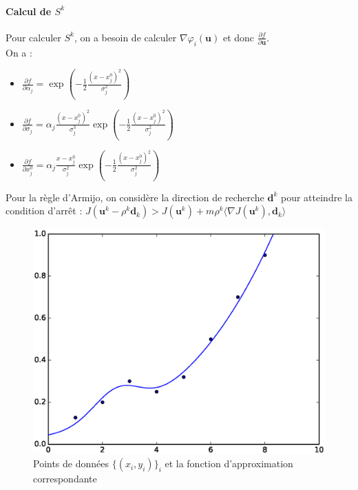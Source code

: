 \documentclass[paper=a4, fontsize=11pt]{article}
\begin{document}
\paragraph{Calcul de $S^k$\\}
Pour calculer $S^k$, on a besoin de calculer $\nabla\varphi_i(\textbf{u})$ et donc $\frac{\partial f }{\partial\textbf{u}}$.\\
On a : \\
\begin{itemize}[label=\textbullet]
\item $\frac{\partial f }{\partial\alpha_j} = \exp(-\frac{1}{2}\frac{(x-x_j^0)^2}{\sigma_j^2})$ 
\item $\frac{\partial f }{\partial\sigma_j} = \alpha_j\frac{(x-x_j^0)^2}{\sigma_j^3}\exp(-\frac{1}{2}\frac{(x-x_j^0)^2}{\sigma_j^2}) $
\item $\frac{\partial f }{\partial x_j^0} = \alpha_j\frac{x-x_j^0}{\sigma_j^2}\exp(-\frac{1}{2}\frac{(x-x_j^0)^2}{\sigma_j^2})$
\end{itemize}
Pour la règle d'Armijo, on considère la direction de recherche $\textbf{d}^k$ pour atteindre la condition d'arrêt : $J(\textbf{u}^k - \rho^k\textbf{d}_k) > J(\textbf{u}^k) + m\rho^k\langle\nabla J(\textbf{u}^k),\textbf{d}_k\rangle$

\begin{figure}[h]
 	\begin{center}
   \includegraphics[scale=0.6]{levenberg-marquardt}
   \end{center}
   \caption{\label{étiquette} Points de données $\lbrace(x_i,y_i)\rbrace_i$ et la fonction d'approximation correspondante}
\end{figure}
\end{document}
